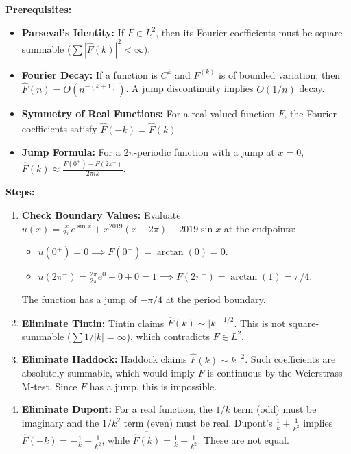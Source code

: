 \begin{solution}
\textbf{Prerequisites:} 
\begin{itemize}
    \item \textbf{Parseval's Identity:} If $F \in L^2$, then its Fourier coefficients must be square-summable ($\sum |\widehat{F}(k)|^2 < \infty$).
    \item \textbf{Fourier Decay:} If a function is $C^k$ and $F^{(k)}$ is of bounded variation, then $\widehat{F}(n) = O(n^{-(k+1)})$. A jump discontinuity implies $O(1/n)$ decay.
    \item \textbf{Symmetry of Real Functions:} For a real-valued function $F$, the Fourier coefficients satisfy $\widehat{F}(-k) = \overline{\widehat{F}(k)}$.
    \item \textbf{Jump Formula:} For a $2\pi$-periodic function with a jump at $x=0$, $\widehat{F}(k) \approx \frac{F(0^+) - F(2\pi^-)}{2\pi i k}$.
\end{itemize}

\bigskip

\textbf{Steps:}
\begin{enumerate}
    \item \textbf{Check Boundary Values:} Evaluate $u(x) = \frac{x}{2\pi} e^{\sin x} + x^{2019}(x-2\pi) + 2019 \sin x$ at the endpoints:
    \begin{itemize}
        \item $u(0^+) = 0 \implies F(0^+) = \arctan(0) = 0$.
        \item $u(2\pi^-) = \frac{2\pi}{2\pi} e^0 + 0 + 0 = 1 \implies F(2\pi^-) = \arctan(1) = \pi/4$.
    \end{itemize}
    The function has a jump of $-\pi/4$ at the period boundary. \\[1em]

    \item \textbf{Eliminate Tintin:} Tintin claims $\widehat{F}(k) \sim |k|^{-1/2}$. This is not square-summable ($\sum 1/|k| = \infty$), which contradicts $F \in L^2$. \\[1em]

    \item \textbf{Eliminate Haddock:} Haddock claims $\widehat{F}(k) \sim k^{-2}$. Such coefficients are absolutely summable, which would imply $F$ is continuous by the Weierstrass M-test. Since $F$ has a jump, this is impossible. \\[1em]

    \item \textbf{Eliminate Dupont:} For a real function, the $1/k$ term (odd) must be imaginary and the $1/k^2$ term (even) must be real. Dupont's $\frac{1}{k} + \frac{1}{k^2}$ implies $\widehat{F}(-k) = -\frac{1}{k} + \frac{1}{k^2}$, while $\overline{\widehat{F}(k)} = \frac{1}{k} + \frac{1}{k^2}$. These are not equal. \\[1em]


\end{enumerate}
\end{solution}
